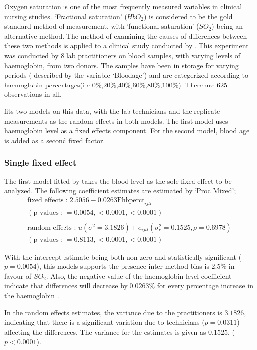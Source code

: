\documentclass[12pt, a4paper]{report}
\begin{document}
Oxygen saturation is one of the most frequently measured variables
in clinical nursing studies. `Fractional saturation' ($HbO_{2}$)
is considered to be the gold standard method of measurement, with
`functional saturation' ($SO_{2}$) being an alternative method.
The method of examining the causes of differences between these
two methods is applied to a clinical study conducted by
\citet{Shiao}. This experiment was conducted by 8 lab
practitioners on blood samples, with varying levels of
haemoglobin, from two donors. The samples have been in storage for
varying periods ( described by the variable `Bloodage') and are
categorized according to haemoglobin percentages(i.e
$0\%$,$20\%$,$40\%$,$60\%$,$80\%$,$100\%$). There are 625
observations in all.

\citet{LaiShiao} fits two models on this data, with the lab
technicians and the replicate measurements as the random effects
in both models. The first model uses haemoglobin level as a fixed
effects component. For the second model, blood age is added as a
second fixed factor.

\subsubsection{Single fixed effect} The first model fitted by \citet{LaiShiao} takes the
blood level as the sole fixed effect to be analyzed. The following
coefficient estimates are estimated by `Proc Mixed';
\begin{eqnarray}
\mbox{fixed effects :   } 2.5056 - 0.0263\mbox{Fhbperct}_{ijtl} \\
(\mbox{p-values :   } = 0.0054, <0.0001, <0.0001)\nonumber\\\nonumber\\
\mbox{random effects :   } u(\sigma^{2}=3.1826) + e_{ijtl}
(\sigma^{2}_{e}=0.1525, \rho= 0.6978) \nonumber\\
(\mbox{p-values :   } = 0.8113, <0.0001, <0.0001)\nonumber
\end{eqnarray}

With the intercept estimate being both non-zero and statistically
significant ($p=0.0054$), this models supports the presence
inter-method bias is $2.5\%$ in favour of $SO_{2}$. Also, the
negative value of the haemoglobin level coefficient indicate that
differences will decrease by $0.0263\%$ for every percentage
increase in the haemoglobin .

In the random effects estimates, the variance due to the
practitioners is $3.1826$, indicating that there is a significant
variation due to technicians ($p=0.0311$) affecting the
differences. The variance for the estimates is given as $0.1525$,
($p<0.0001$).
\end{document}
